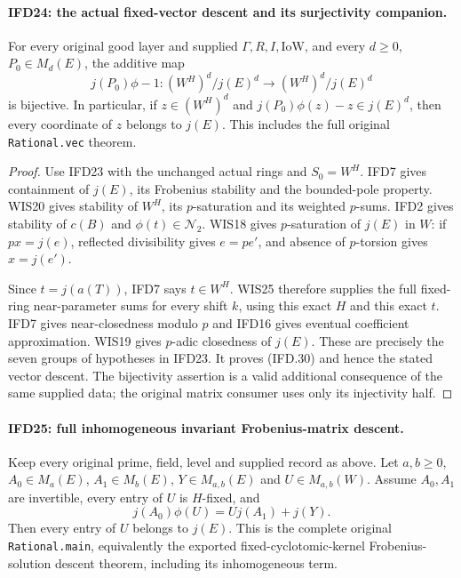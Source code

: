 \documentclass[11pt,a4paper]{article}
\numberwithin{equation}{section}
\theoremstyle{remark}\newtheorem{remark}[theorem]{Remark}
\begin{document}
\paragraph{IFD24: the actual fixed-vector descent and its surjectivity companion.}
\label{claim:IFD24}
For every original good layer and supplied $\Gamma,R,I,\mathrm{IoW}$,
and every $d\geq0$, $P_0\in M_d(E)$, the additive map
\[
              j(P_0)\phi-1:(W^H)^d/j(E)^d
                                      \longrightarrow(W^H)^d/j(E)^d
                                                               \tag{IFD.30}
\]
is bijective. In particular, if $z\in(W^H)^d$ and
$j(P_0)\phi(z)-z\in j(E)^d$, then every coordinate of $z$
belongs to $j(E)$. This includes the full original
\texttt{Rational.\allowbreak vec} theorem.

\begin{proof}
Use IFD23 with the unchanged actual rings and $S_0=W^H$.
IFD7 gives containment of $j(E)$, its Frobenius stability and
the bounded-pole property. WIS20 gives stability of $W^H$,
its $p$-saturation and its weighted $p$-sums.
IFD2 gives stability of $c(B)$ and $\phi(t)\in\mathcal N_2$.
WIS18 gives $p$-saturation of $j(E)$ in $W$: if $px=j(e)$,
reflected divisibility gives $e=pe'$, and absence of $p$-torsion
gives $x=j(e')$.

Since $t=j(a(T))$, IFD7 says $t\in W^H$.
WIS25 therefore supplies the full fixed-ring near-parameter sums
for every shift $k$, using this exact $H$ and this exact $t$.
IFD7 gives near-closedness modulo $p$ and IFD16 gives eventual
coefficient approximation. WIS19 gives $p$-adic closedness of
$j(E)$. These are precisely the seven groups of hypotheses in
IFD23. It proves (IFD.30) and hence the stated vector descent.
The bijectivity assertion is a valid additional consequence of the
same supplied data; the original matrix consumer uses only its
injectivity half.
\end{proof}

\paragraph{IFD25: full inhomogeneous invariant Frobenius-matrix descent.}
\label{claim:IFD25}
Keep every original prime, field, level and supplied record as above.
Let $a,b\geq0$, $A_0\in M_a(E)$, $A_1\in M_b(E)$,
$Y\in M_{a,b}(E)$ and $U\in M_{a,b}(W)$.
Assume $A_0,A_1$ are invertible, every entry of $U$ is $H$-fixed,
and
\[
                        j(A_0)\phi(U)=Uj(A_1)+j(Y).         \tag{IFD.31}
\]
Then every entry of $U$ belongs to $j(E)$.
This is the complete original \texttt{Rational.\allowbreak main}, equivalently
the exported fixed-cyclotomic-kernel Frobenius-solution descent
theorem, including its inhomogeneous term.
\end{document}
